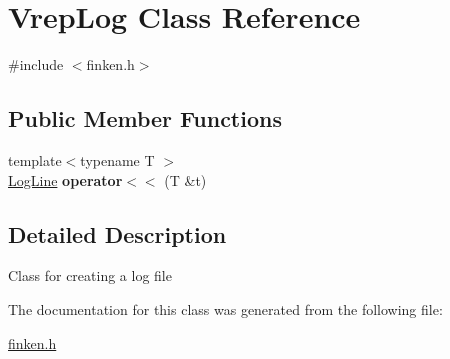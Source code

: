 \hypertarget{classVrepLog}{}\section{Vrep\+Log Class Reference}
\label{classVrepLog}


{\ttfamily \#include $<$finken.\+h$>$}

\subsection*{Public Member Functions}
\begin{DoxyCompactItemize}
\item 
{\footnotesize template$<$typename T $>$ }\\\hyperlink{classLogLine}{Log\+Line} {\bfseries operator$<$$<$} (T \&t)\hypertarget{classVrepLog_a1a2744fc0ca891c3bf9767395791914b}{}\label{classVrepLog_a1a2744fc0ca891c3bf9767395791914b}

\end{DoxyCompactItemize}


\subsection{Detailed Description}
Class for creating a log file 

The documentation for this class was generated from the following file\+:\begin{DoxyCompactItemize}
\item 
\hyperlink{finken_8h}{finken.\+h}\end{DoxyCompactItemize}
